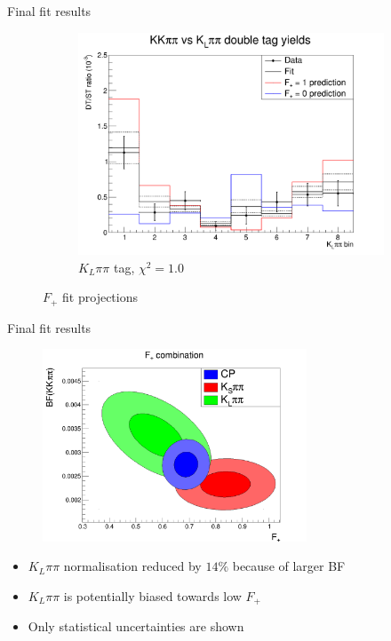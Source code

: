 \documentclass{beamer}
\begin{document}
\begin{frame}{Final fit results}
\begin{figure}
\begin{subfigure}{0.33\textwidth}
      \centering
      \includegraphics[width=\textwidth]{Plots/CPeven_fraction_combination_KLpipi.png}
      \caption{$K_L\pi\pi$ tag, $\chi^2 = 1.0$}
    \end{subfigure}
    \caption{$F_+$ fit projections}
  \end{figure}
\end{frame}

\begin{frame}{Final fit results}
  \begin{figure}
    \centering
    \includegraphics[width=0.7\textwidth]{Plots/FPlus_contours.png}
  \end{figure}
  \begin{itemize}
    \item{$K_L\pi\pi$ normalisation reduced by $14\%$ because of larger BF}
    \item{$K_L\pi\pi$ is potentially biased towards low $F_+$}
    \item{Only statistical uncertainties are shown}
  \end{itemize}
\end{frame}
\end{document}
